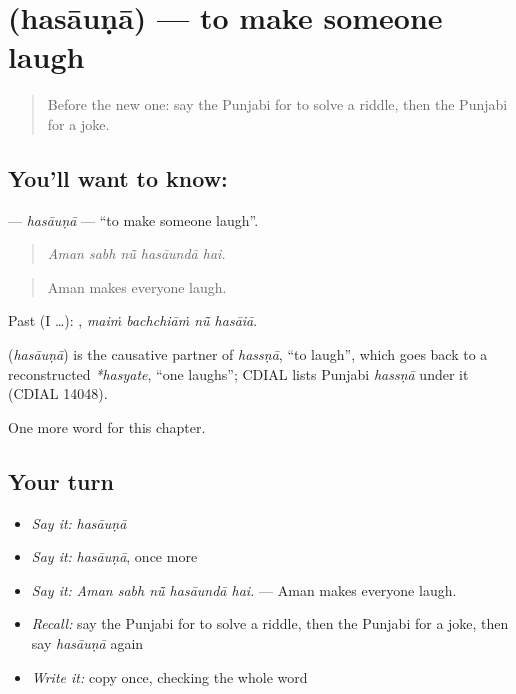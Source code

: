 \section[\texorpdfstring{\pa{ਹਸਾਉਣਾ} (hasāuṇā)}{ਹਸਾਉਣਾ (hasāuṇā)}]{ (hasāuṇā) — to make someone laugh}

\label{lesson:PA-C355-hasauna}



\begin{quote}
Before the new one: say the Punjabi for to solve a riddle, then the Punjabi for a joke.
\end{quote}

\subsection*{You'll want to know: }
\textbf{} — \emph{hasāuṇā} — \textquotedblleft{}to make someone laugh\textquotedblright{}.

\begin{quote}
    
\end{quote}

\begin{quote}
\emph{Aman sabh nū̃ hasāundā hai.}
\end{quote}

\begin{quote}
Aman makes everyone laugh.
\end{quote}

Past (I …):    , \emph{maiṁ bachchiāṁ nū̃ hasāiā}.

\begin{cousinweb}
\textbf{} (\emph{hasāuṇā}) is the causative partner of \emph{hassṇā}, \textquotedblleft{}to laugh\textquotedblright{}, which goes back to a reconstructed \emph{*hasyate}, \textquotedblleft{}one laughs\textquotedblright{}; CDIAL lists Punjabi \emph{hassṇā} under it (CDIAL 14048).
\end{cousinweb}

\begin{grammarlens}[title={What you've built}]
One more word for this chapter.
\end{grammarlens}

\subsection*{Your turn}
\begin{itemize}
\raggedright
  \item \emph{Say it:} \emph{hasāuṇā}
  \item \emph{Say it:} \emph{hasāuṇā}, once more
  \item \emph{Say it:} \emph{Aman sabh nū̃ hasāundā hai.} — Aman makes everyone laugh.
  \item \emph{Recall:} say the Punjabi for to solve a riddle, then the Punjabi for a joke, then say \emph{hasāuṇā} again
  \item \emph{Write it:} copy \textbf{} once, checking the whole word
\end{itemize}

